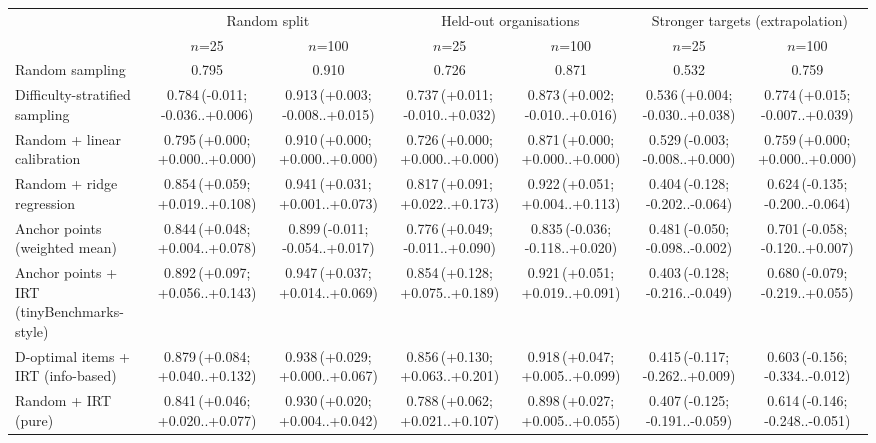 \begin{tabular}{lcccccc}
\toprule
 & \multicolumn{2}{c}{Random split} & \multicolumn{2}{c}{Held-out organisations} & \multicolumn{2}{c}{Stronger targets (extrapolation)} \\
 & $n$=25 & $n$=100 & $n$=25 & $n$=100 & $n$=25 & $n$=100 \\
\midrule
Random sampling & 0.795 & 0.910 & 0.726 & 0.871 & 0.532 & 0.759 \\
Difficulty-stratified sampling & 0.784\,\scriptsize(-0.011; -0.036..+0.006) & 0.913\,\scriptsize(+0.003; -0.008..+0.015) & 0.737\,\scriptsize(+0.011; -0.010..+0.032) & 0.873\,\scriptsize(+0.002; -0.010..+0.016) & 0.536\,\scriptsize(+0.004; -0.030..+0.038) & 0.774\,\scriptsize(+0.015; -0.007..+0.039) \\
Random + linear calibration & 0.795\,\scriptsize(+0.000; +0.000..+0.000) & 0.910\,\scriptsize(+0.000; +0.000..+0.000) & 0.726\,\scriptsize(+0.000; +0.000..+0.000) & 0.871\,\scriptsize(+0.000; +0.000..+0.000) & 0.529\,\scriptsize(-0.003; -0.008..+0.000) & 0.759\,\scriptsize(+0.000; +0.000..+0.000) \\
Random + ridge regression & 0.854\,\scriptsize(+0.059; +0.019..+0.108) & 0.941\,\scriptsize(+0.031; +0.001..+0.073) & 0.817\,\scriptsize(+0.091; +0.022..+0.173) & 0.922\,\scriptsize(+0.051; +0.004..+0.113) & 0.404\,\scriptsize(-0.128; -0.202..-0.064) & 0.624\,\scriptsize(-0.135; -0.200..-0.064) \\
Anchor points (weighted mean) & 0.844\,\scriptsize(+0.048; +0.004..+0.078) & 0.899\,\scriptsize(-0.011; -0.054..+0.017) & 0.776\,\scriptsize(+0.049; -0.011..+0.090) & 0.835\,\scriptsize(-0.036; -0.118..+0.020) & 0.481\,\scriptsize(-0.050; -0.098..-0.002) & 0.701\,\scriptsize(-0.058; -0.120..+0.007) \\
Anchor points + IRT (tinyBenchmarks-style) & 0.892\,\scriptsize(+0.097; +0.056..+0.143) & 0.947\,\scriptsize(+0.037; +0.014..+0.069) & 0.854\,\scriptsize(+0.128; +0.075..+0.189) & 0.921\,\scriptsize(+0.051; +0.019..+0.091) & 0.403\,\scriptsize(-0.128; -0.216..-0.049) & 0.680\,\scriptsize(-0.079; -0.219..+0.055) \\
D-optimal items + IRT (info-based) & 0.879\,\scriptsize(+0.084; +0.040..+0.132) & 0.938\,\scriptsize(+0.029; +0.000..+0.067) & 0.856\,\scriptsize(+0.130; +0.063..+0.201) & 0.918\,\scriptsize(+0.047; +0.005..+0.099) & 0.415\,\scriptsize(-0.117; -0.262..+0.009) & 0.603\,\scriptsize(-0.156; -0.334..-0.012) \\
Random + IRT (pure) & 0.841\,\scriptsize(+0.046; +0.020..+0.077) & 0.930\,\scriptsize(+0.020; +0.004..+0.042) & 0.788\,\scriptsize(+0.062; +0.021..+0.107) & 0.898\,\scriptsize(+0.027; +0.005..+0.055) & 0.407\,\scriptsize(-0.125; -0.191..-0.059) & 0.614\,\scriptsize(-0.146; -0.248..-0.051) \\

\end{tabular}
